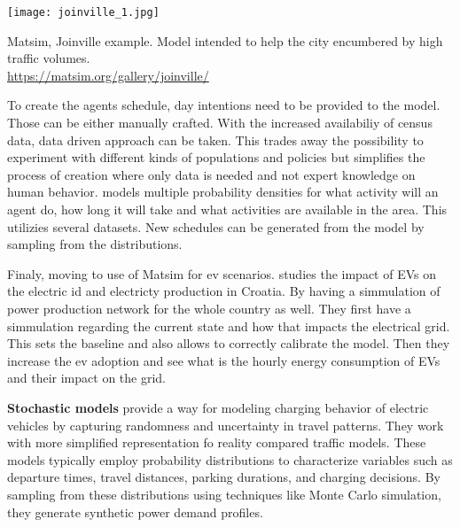 \begin{marginfigure}
    \texttt{[image: joinville\_1.jpg]}
    \caption[Matsim, Joinville example]{Matsim, Joinville example. Model intended to help the city encumbered by high traffic volumes.\\
        \url{https://matsim.org/gallery/joinville/}}
\end{marginfigure}

To create the agents schedule, day intentions need to be provided to the model. Those can be either manually crafted. With the increased availabiliy of census data, data driven approach can be taken. This trades away the possibility to experiment with different kinds of populations and policies but simplifies the process of creation where only data is needed and not expert knowledge on human behavior.  models multiple probability densities for what activity will an agent do, how long it will take and what activities are available in the area. This utilizies several datasets. New schedules can be generated from the model by sampling from the distributions.

Finaly, moving to use of Matsim for ev scenarios.  studies the impact of EVs on the electric id and electricty production in Croatia. By having a simmulation of power production network for the whole country as well. They first have a simmulation regarding the current state and how that impacts the electrical grid. This sets the baseline and also allows to correctly calibrate the model. Then they increase the ev adoption and see what is the hourly energy consumption of EVs and their impact on the grid.


\textbf{Stochastic models} provide a way for modeling charging behavior of electric vehicles by capturing randomness and uncertainty in travel patterns. They work with more simplified representation fo reality compared traffic models. These models typically employ probability distributions to characterize variables such as departure times, travel distances, parking durations, and charging decisions. By sampling from these distributions using techniques like Monte Carlo simulation, they generate synthetic power demand profiles.

